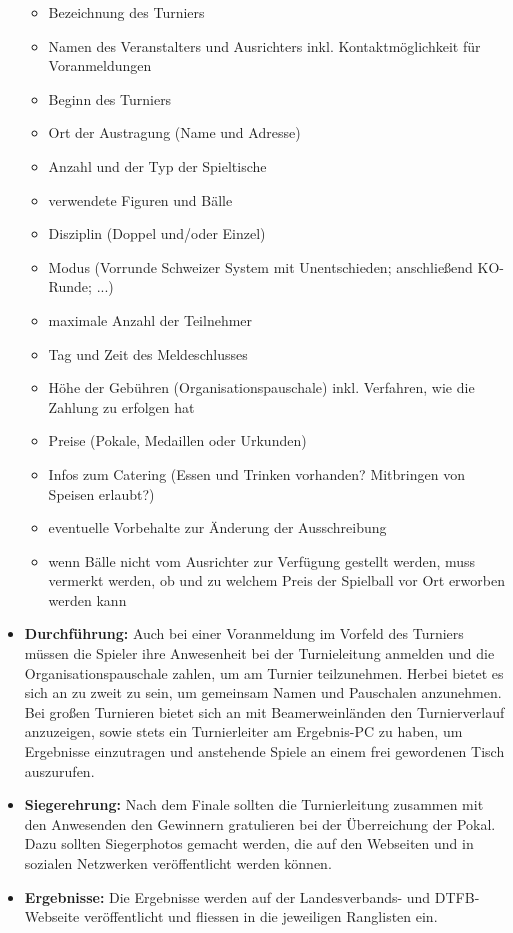 \begin{itemize}
\begin{itemize}
\item Bezeichnung des Turniers
\item Namen des Veranstalters und Ausrichters inkl. Kontaktmöglichkeit für Voranmeldungen
\item Beginn des Turniers
\item Ort der Austragung (Name und Adresse)
\item Anzahl und der Typ der Spieltische
\item verwendete Figuren und Bälle 
\item Disziplin (Doppel und/oder Einzel)
\item Modus (Vorrunde Schweizer System mit Unentschieden; anschließend KO-Runde; ...)
\item maximale Anzahl der Teilnehmer
\item Tag und Zeit des Meldeschlusses
\item Höhe der Gebühren (Organisationspauschale) inkl. Verfahren, wie die Zahlung zu erfolgen hat
\item Preise (Pokale, Medaillen oder Urkunden)
\item Infos zum Catering (Essen und Trinken vorhanden? Mitbringen von Speisen erlaubt?)
\item eventuelle Vorbehalte zur Änderung der Ausschreibung
\item wenn Bälle nicht vom Ausrichter zur Verfügung gestellt werden, muss vermerkt werden, ob und zu welchem Preis der Spielball vor Ort erworben werden kann
\end{itemize}

\item \textbf{Durchführung:} 
Auch bei einer Voranmeldung im Vorfeld des Turniers müssen die Spieler ihre Anwesenheit bei der Turnieleitung anmelden und die Organisationspauschale zahlen, um am Turnier teilzunehmen. Herbei bietet es sich an zu zweit zu sein, um gemeinsam Namen und Pauschalen anzunehmen.
Bei großen Turnieren bietet sich an mit Beamerweinländen den Turnierverlauf anzuzeigen, sowie stets ein Turnierleiter am Ergebnis-PC zu haben, um Ergebnisse einzutragen und anstehende Spiele an einem frei gewordenen Tisch auszurufen.
\item \textbf{Siegerehrung:} Nach dem Finale sollten die Turnierleitung zusammen mit den Anwesenden den Gewinnern gratulieren bei der Überreichung der Pokal. Dazu sollten Siegerphotos gemacht werden, die auf den Webseiten und in sozialen Netzwerken veröffentlicht werden können. 
\item \textbf{Ergebnisse:} Die Ergebnisse werden auf der Landesverbands- und DTFB-Webseite veröffentlicht und fliessen in die jeweiligen Ranglisten ein.
\end{itemize}

